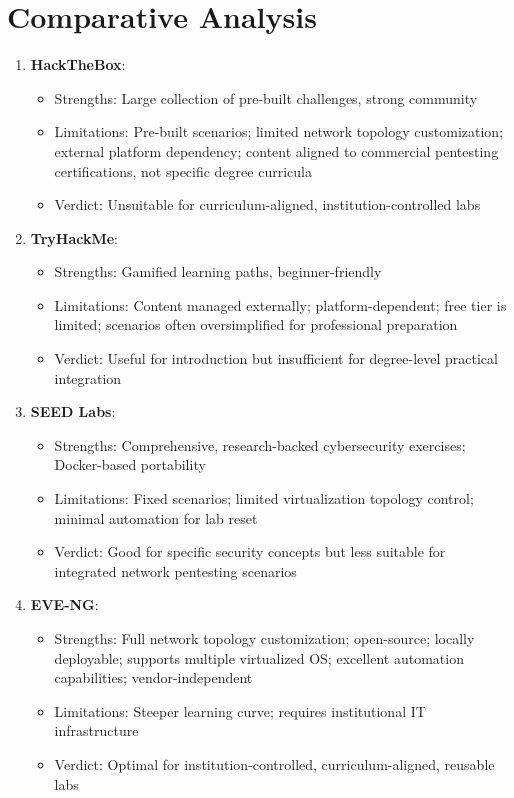 \section{Comparative Analysis}

\begin{enumerate}
    \item \textbf{HackTheBox}: 
    \begin{itemize}
        \item Strengths: Large collection of pre-built challenges, strong community
        \item Limitations: Pre-built scenarios; limited network topology customization; 
                external platform dependency; content aligned to commercial 
                pentesting certifications, not specific degree curricula
        \item Verdict: Unsuitable for curriculum-aligned, institution-controlled labs
    \end{itemize}
    
    \item \textbf{TryHackMe}: 
    \begin{itemize}
        \item Strengths: Gamified learning paths, beginner-friendly
        \item Limitations: Content managed externally; platform-dependent; 
                free tier is limited; scenarios often oversimplified for 
                professional preparation
        \item Verdict: Useful for introduction but insufficient for degree-level 
                practical integration
    \end{itemize}
    
    \item \textbf{SEED Labs}: 
    \begin{itemize}
        \item Strengths: Comprehensive, research-backed cybersecurity exercises; 
                Docker-based portability
        \item Limitations: Fixed scenarios; limited virtualization topology control; 
                minimal automation for lab reset
        \item Verdict: Good for specific security concepts but less suitable for 
                integrated network pentesting scenarios
    \end{itemize}
    
    \item \textbf{EVE-NG}: 
    \begin{itemize}
        \item Strengths: Full network topology customization; open-source; 
                locally deployable; supports multiple virtualized OS; 
                excellent automation capabilities; vendor-independent
        \item Limitations: Steeper learning curve; requires institutional IT infrastructure
        \item Verdict: Optimal for institution-controlled, curriculum-aligned, 
                reusable labs
    \end{itemize}
\end{enumerate}

